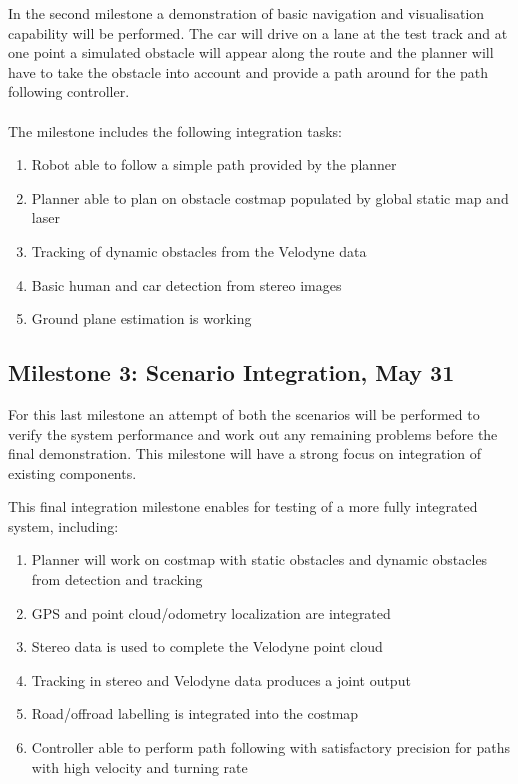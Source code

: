 \documentclass[11pt,a4paper]{article}
\begin{document}
In the second milestone a demonstration of basic navigation and visualisation capability will be performed.
The car will drive on a lane at the test track and at one point a
simulated obstacle will appear along the route and the planner will have to take the obstacle into account and provide a path around for the path following controller. \\ \\
The milestone includes the following integration tasks:
\begin{enumerate}
\item Robot able to follow a simple path provided by the planner
\item Planner able to plan on obstacle costmap populated by global static map and laser
\item Tracking of dynamic obstacles from the Velodyne data
\item Basic human and car detection from stereo images
\item Ground plane estimation is working
\end{enumerate}

\subsection{Milestone 3: Scenario Integration, May 31}
\label{milestone3}

For this last milestone an attempt of both the scenarios will be performed to verify the system performance and work out any remaining problems before the final demonstration. This milestone will have a strong
focus on integration of existing components.

This final integration milestone enables for testing
of a more fully integrated system, including:
\begin{enumerate}
\item Planner will work on costmap with static obstacles and dynamic obstacles from detection and tracking
\item GPS and point cloud/odometry localization are integrated
\item Stereo data is used to complete the Velodyne point cloud
\item Tracking in stereo and Velodyne data produces a joint output
\item Road/offroad labelling is integrated into the costmap
\item Controller able to perform path following with satisfactory precision for paths with high velocity and turning rate
\end{enumerate}
\end{document}
